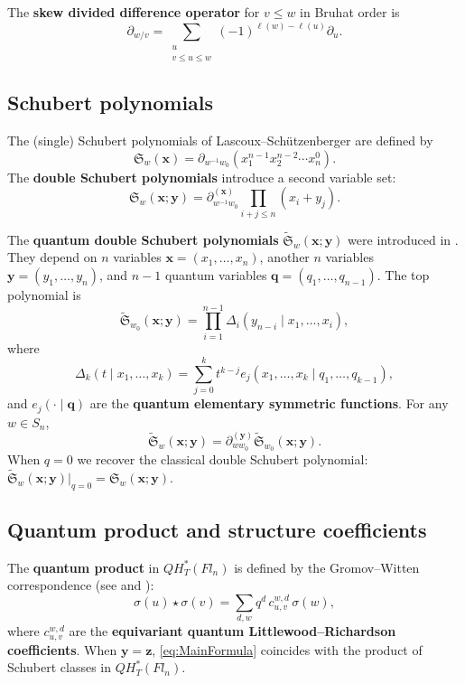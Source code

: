 \documentclass[12pt]{amsart}
\begin{document}
The \textbf{skew divided difference operator} for $v\le w$ in Bruhat order is
\[
\partial_{w/v} = \sum_{\substack{u\\v\le u\le w}}(-1)^{\ell(w)-\ell(u)}\partial_u.
\label{eq:SkewDividedDifference}
\]

\subsection{Schubert polynomials}
The (single) Schubert polynomials of Lascoux--Sch\"utzenberger are defined by
\[
\mathfrak{S}_w(\mathbf{x}) = \partial_{w^{-1}w_0}(x_1^{n-1}x_2^{n-2}\cdots x_n^0).
\label{eq:SingleSchubert}
\]
The \textbf{double Schubert polynomials} introduce a second variable set:
\[
\mathfrak{S}_w(\mathbf{x};\mathbf{y})
= \partial_{w^{-1}w_0}^{(\mathbf{x})}\prod_{i+j\le n}(x_i+y_j).
\label{eq:DoubleSchubert}
\]

The \textbf{quantum double Schubert polynomials} $\widetilde{\mathfrak{S}}_w(\mathbf{x};\mathbf{y})$
were introduced in \cite{KM}. They depend on $n$ variables $\mathbf{x}=(x_1,\ldots,x_n)$,
another $n$ variables $\mathbf{y}=(y_1,\ldots,y_n)$, and $n-1$ quantum variables
$\mathbf{q}=(q_1,\ldots,q_{n-1})$. The top polynomial is
\[
\widetilde{\mathfrak{S}}_{w_0}(\mathbf{x};\mathbf{y})
= \prod_{i=1}^{n-1}\Delta_i(y_{n-i}\mid x_1,\ldots,x_i),
\label{eq:TopPolynomial}
\]
where
\[
\Delta_k(t\mid x_1,\ldots,x_k)
= \sum_{j=0}^k t^{k-j}e_j(x_1,\ldots,x_k\mid q_1,\ldots,q_{k-1}),
\label{eq:QuantumDelta}
\]
and $e_j(\cdot\mid\mathbf{q})$ are the \textbf{quantum elementary symmetric functions}.
For any $w\in S_n$,
\[
\widetilde{\mathfrak{S}}_w(\mathbf{x};\mathbf{y})
= \partial_{ww_0}^{(\mathbf{y})}\widetilde{\mathfrak{S}}_{w_0}(\mathbf{x};\mathbf{y}).
\label{eq:QuantumSchubertRecursion}
\]
When $q=0$ we recover the classical double Schubert polynomial:
$\widetilde{\mathfrak{S}}_w(\mathbf{x};\mathbf{y})\big|_{q=0} = \mathfrak{S}_w(\mathbf{x};\mathbf{y})$.

\subsection{Quantum product and structure coefficients}
The \textbf{quantum product} in $QH_T^*(Fl_n)$ is defined by the Gromov--Witten correspondence
(see \cite[Definition 1.1]{Mihalcea} and \cite{Kim2000}):
\[
\sigma(u)\star\sigma(v) = \sum_{d,w} q^d\,c_{u,v}^{w,d}\,\sigma(w),
\label{eq:QuantumProductRing}
\]
where $c_{u,v}^{w,d}$ are the \textbf{equivariant quantum Littlewood--Richardson coefficients}.
When $\mathbf{y}=\mathbf{z}$, \cref{eq:MainFormula} coincides with the product
of Schubert classes in $QH_T^*(Fl_n)$.
\end{document}
